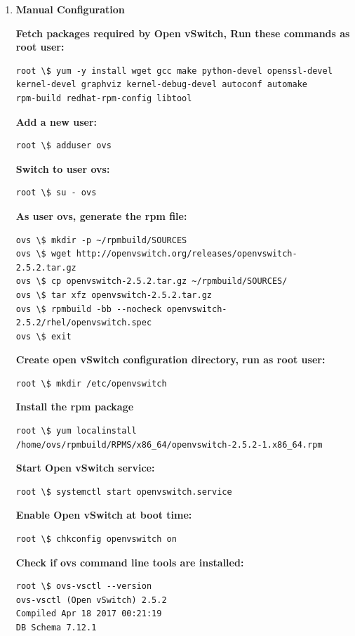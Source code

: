 \documentclass[12pt]{extarticle}
\begin{document}
\begin{enumerate}
    \item \textbf{Manual Configuration}
    
\textbf{Fetch packages required by Open vSwitch, Run these commands as root user:}
\begin{verbatim}
root \$ yum -y install wget gcc make python-devel openssl-devel
kernel-devel graphviz kernel-debug-devel autoconf automake 
rpm-build redhat-rpm-config libtool
\end{verbatim}
\noindent
\textbf{Add a new user: }

\begin{verbatim}
root \$ adduser ovs
\end{verbatim}
\noindent
\textbf{Switch to user ovs:}

\begin{verbatim}
root \$ su - ovs
\end{verbatim}
\noindent
\textbf{As user ovs, generate the rpm file:}

\begin{verbatim}
ovs \$ mkdir -p ~/rpmbuild/SOURCES
ovs \$ wget http://openvswitch.org/releases/openvswitch-2.5.2.tar.gz
ovs \$ cp openvswitch-2.5.2.tar.gz ~/rpmbuild/SOURCES/
ovs \$ tar xfz openvswitch-2.5.2.tar.gz
ovs \$ rpmbuild -bb --nocheck openvswitch-2.5.2/rhel/openvswitch.spec
ovs \$ exit
\end{verbatim}

\noindent
\textbf{Create open vSwitch configuration directory, run as root user:}

\noindent
\begin{verbatim}
root \$ mkdir /etc/openvswitch
\end{verbatim}

\noindent
\textbf{Install the rpm package}
\begin{verbatim}
root \$ yum localinstall /home/ovs/rpmbuild/RPMS/x86_64/openvswitch-2.5.2-1.x86_64.rpm
\end{verbatim}

\noindent
\textbf{Start Open vSwitch service:}
\begin{verbatim}
root \$ systemctl start openvswitch.service
\end{verbatim}

\noindent
\textbf{Enable Open vSwitch at boot time:}
\begin{verbatim}
root \$ chkconfig openvswitch on
\end{verbatim}

\noindent
\textbf{Check if ovs command line tools are installed:}
\begin{verbatim}
root \$ ovs-vsctl --version
ovs-vsctl (Open vSwitch) 2.5.2
Compiled Apr 18 2017 00:21:19
DB Schema 7.12.1
\end{verbatim}


\end{enumerate}
\end{document}
